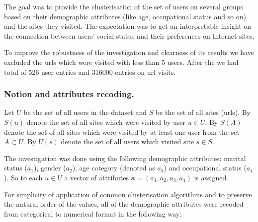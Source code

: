 \documentclass[runningheads,a4paper]{llncs}
\begin{document}
The goal was to provide the clusterisation of the set of users on several groups based on their demographic attributes (like age, occupational status and so on) and the sites they visited. The expectation was to get an interpretable insight on the connection between users' social status and their preferences on Internet sites. 


To improve the robustness of the investigation and clearness of its results we have excluded the urls which were visited with less than 5 users. After the we had total of 526 user entries and 316000 entries on url visits.



\subsubsection{Notion and attributes recoding.}

Let $U$ be the set of all users in the dataset and $S$ be the set of all sites (urls). By $S(u)$ denote the set of all sites which were visited by user $u \in U$. By $S(A)$ denote the set of all sites which were visited by at least one user from the set $A \subset U$. By $U(s)$ denote the set of all users which visited site $s \in S$.


The investigation was done using the following demographic attributes: marital status ($a_1$), gender ($a_2$), age category (denoted as $a_3$) and occupational status ($a_4$). So to each $u \in U$ a vector of attributes $\boldsymbol{a} = (a_1, a_2, a_3, a_4)$ is assigned.

For simplicity of application of common clusterisation algorithms and to preserve the natural order of the values, all of the demographic attributes were recoded from categorical to numerical format in the following way:
\end{document}
